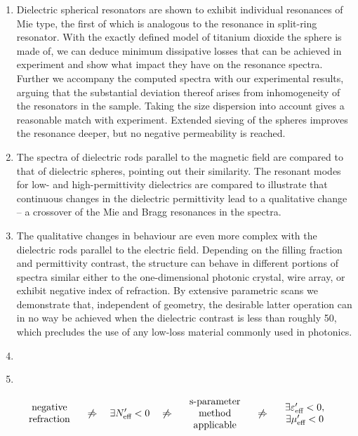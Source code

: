 \begin{enumerate}
{} 
\item{Dielectric spherical resonators are shown to exhibit individual resonances of Mie type, the first of which is analogous to the resonance in split-ring resonator. With the exactly defined model of titanium dioxide the sphere is made of, we can deduce minimum dissipative losses that can be achieved in experiment and show what impact they have on the resonance spectra. Further we accompany the computed spectra with our experimental results, arguing that the substantial deviation thereof arises from inhomogeneity of the resonators in the sample. Taking the size dispersion into account gives a reasonable match with experiment. Extended sieving of the spheres improves the resonance deeper, but no negative permeability is reached.
} 
\item{The spectra of dielectric rods parallel to the magnetic field are compared to that of dielectric spheres, pointing out their similarity. The resonant modes for low- and high-permittivity dielectrics are compared to illustrate that continuous changes in the dielectric permittivity lead to a qualitative change -- a crossover of the Mie and Bragg resonances in the spectra.
} 
\item{The qualitative changes in behaviour are even more complex with the dielectric rods parallel to the electric field. Depending on the filling fraction and permittivity contrast, the structure can behave in different portions of spectra similar either to the one-dimensional photonic crystal, wire array, or exhibit negative index of refraction. By extensive parametric scans we demonstrate that, independent of geometry, the desirable latter operation can in no way be achieved when the dielectric contrast is less than roughly 50, which precludes the use of any low-loss material commonly used in photonics. 
} 
\item{
} 
\item{
}
\end{enumerate}


\begin{equation}
\begin{array}{c} \text{negative}\\ \text{refraction} \end{array}
\quad\not\Rightarrow\quad  \exists N_{\text{eff} }' < 0 
\quad\not\Rightarrow\quad \begin{array}{c} \text{s-parameter}\\ \text{method}\\ \text{applicable}  \end{array}
\quad\not\Rightarrow\quad \begin{array}{c} \exists \varepsilon_{\text{eff} }'<0,\\ \exists\mu_{\text{eff} }'<0  \end{array} 
\label{eq_implications}\end{equation} %



